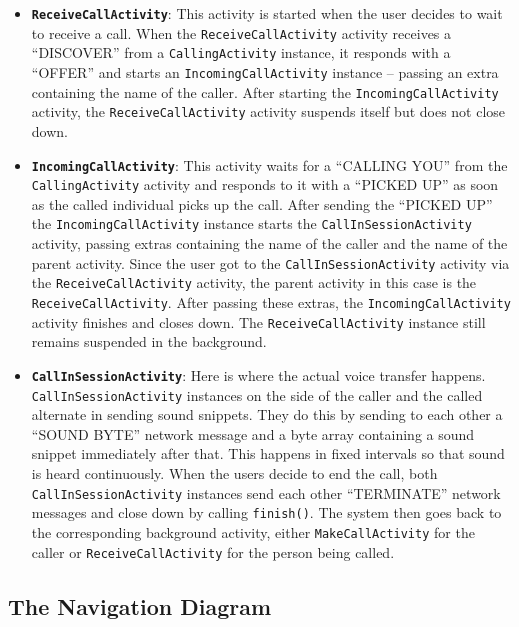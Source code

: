 \documentclass[12pt,svgnames,smaller]{article} %
\begin{document}
\begin{itemize}
		\item \textbf{\texttt{ReceiveCallActivity}}: This activity is started when the user decides to wait to receive a call. When the \texttt{ReceiveCallActivity} activity receives a “DISCOVER” from a \texttt{CallingActivity} instance, it responds with a “OFFER” and starts an \texttt{IncomingCallActivity} instance – passing an extra containing the name of the caller. After starting the \texttt{IncomingCallActivity} activity, the \texttt{ReceiveCallActivity} activity suspends itself but does not close down.
		\item \textbf{\texttt{IncomingCallActivity}}: This activity waits for a “CALLING YOU” from the \texttt{CallingActivity} activity and responds to it with a “PICKED UP” as soon as the called individual picks up the call. After sending the “PICKED UP” the \texttt{IncomingCallActivity} instance starts the \texttt{CallInSessionActivity} activity, passing extras containing the name of the caller and the name of the parent activity. Since the user got to the \texttt{CallInSessionActivity} activity via the \texttt{ReceiveCallActivity} activity, the parent activity in this case is the \texttt{ReceiveCallActivity}. After passing these extras, the \texttt{IncomingCallActivity} activity finishes and closes down. The \texttt{ReceiveCallActivity} instance still remains suspended in the background.
		\item \textbf{\texttt{CallInSessionActivity}}: Here is where the actual voice transfer happens. \texttt{CallInSessionActivity} instances on the side of the caller and the called alternate in sending sound snippets. They do this by sending to each other a “SOUND BYTE” network message and a byte array containing a sound snippet immediately after that. This happens in fixed intervals so that sound is heard continuously. When the users decide to end the call, both \texttt{CallInSessionActivity} instances send each other “TERMINATE” network messages and close down by calling \texttt{finish()}. The system then goes back to the corresponding background activity, either \texttt{MakeCallActivity} for the caller or \texttt{ReceiveCallActivity} for the person being called.
	\end{itemize}
	
	\subsection{The Navigation Diagram}
	
\end{document}
